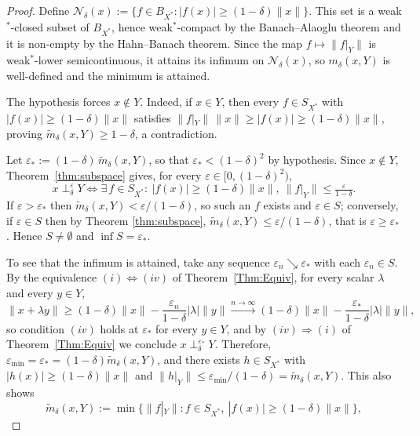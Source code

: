 \documentclass[10pt,a4paper]{amsart}
\begin{document}
\begin{proof}
Define $\mathscr{N}_\delta(x) := \{ f \in B_{X^*} : |f(x)| \geq (1-\delta)\|x\| \}$.
This set is a weak$^*$-closed subset of $B_{X^*}$, hence weak$^*$-compact by the
Banach--Alaoglu theorem and it is non-empty by the Hahn--Banach
theorem. Since the map $f \mapsto \|f|_Y\|$ is
weak$^*$-lower semicontinuous, it attains its infimum on $\mathscr{N}_\delta(x)$,
so $m_\delta(x,Y)$ is well-defined and the minimum is attained.


\medskip

\noindent The hypothesis forces $x\notin Y$. Indeed, if $x\in Y$, then every $f\in S_{X^*}$ with $|f(x)|\geq(1-\delta)\|x\|$ satisfies $\|f|_Y\|\,\|x\|\geq |f(x)|\geq (1-\delta)\|x\|$, proving $\widetilde m_\delta(x,Y)\geq 1-\delta$, a contradiction.


\medskip


\noindent Let $\varepsilon_* := (1-\delta)\,\widetilde m_\delta(x,Y)$,
so that $\varepsilon_*<(1-\delta)^2$ by hypothesis. Since $x\notin Y$,
Theorem~\ref{thm:subspace} gives, for every $\varepsilon\in[0,(1-\delta)^2)$,
\[
x \perp_\delta^{\varepsilon} Y \iff \exists\, f\in S_{X^*}:~ |f(x)|\geq (1-\delta)\|x\|,~
\|f|_Y\|\leq \tfrac{\varepsilon}{1-\delta}.
\]
If $\varepsilon>\varepsilon_*$ then $\widetilde m_\delta(x,Y)<\varepsilon/(1-\delta)$, so
such an $f$ exists and $\varepsilon\in S$; conversely, if $\varepsilon\in S$ then by Theorem \ref{thm:subspace}, $\widetilde m_\delta(x,Y)\leq \varepsilon/(1-\delta)$, that is
$\varepsilon\geq\varepsilon_*$. Hence $S\neq\emptyset$ and $\inf S=\varepsilon_*$.


\medskip

\noindent To see that the infimum is attained, take any sequence
$\varepsilon_n \searrow \varepsilon_*$
with each $\varepsilon_n \in S$. By the equivalence
$(i)\Leftrightarrow(iv)$ of Theorem~\ref{Thm:Equiv}, for every scalar $\lambda$
and every $y \in Y$,
\[
\|x + \lambda y\|
\geq (1-\delta)\|x\| - \frac{\varepsilon_n}{1-\delta}|\lambda|\|y\|
\xrightarrow{n \to \infty}
(1-\delta)\|x\| - \frac{\varepsilon_*}{1-\delta}|\lambda|\|y\|,
\]
so condition $(iv)$ holds at $\varepsilon_*$ for every $y \in Y$, and by
$(iv)\Rightarrow(i)$ of Theorem~\ref{Thm:Equiv} we conclude
$x \perp_\delta^{\varepsilon_*} Y$. Therefore, $\varepsilon_{\min}=\varepsilon_*=(1-\delta)\widetilde m_\delta(x,Y)$, and there exists $h\in S_{X^*}$ with
$|h(x)|\geq(1-\delta)\|x\|$ and $\|h|_Y\|\leq \varepsilon_{\min}/(1-\delta)=\widetilde m_\delta(x,Y)$. This also shows
\[
\widetilde m_\delta(x,Y) := \min\bigl\{\|f|_Y\| : f \in S_{X^*},\
|f(x)| \geq (1-\delta)\|x\|\bigr\},
\]


\end{proof}
\end{document}

